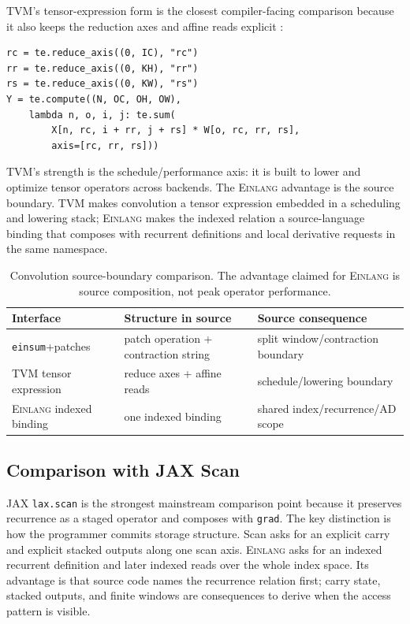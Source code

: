\documentclass[sigplan,screen,nonacm]{acmart}
\newcommand{\einlang}{\textsc{Einlang}}
\begin{document}
TVM's tensor-expression form is the closest compiler-facing comparison because it also keeps the reduction axes and affine reads explicit \cite{tvm2018}:
\begin{lstlisting}[style=pythoncode]
rc = te.reduce_axis((0, IC), "rc")
rr = te.reduce_axis((0, KH), "rr")
rs = te.reduce_axis((0, KW), "rs")
Y = te.compute((N, OC, OH, OW),
    lambda n, o, i, j: te.sum(
        X[n, rc, i + rr, j + rs] * W[o, rc, rr, rs],
        axis=[rc, rr, rs]))
\end{lstlisting}
TVM's strength is the schedule/performance axis: it is built to lower and optimize tensor operators across backends. The \einlang{} advantage is the source boundary. TVM makes convolution a tensor expression embedded in a scheduling and lowering stack; \einlang{} makes the indexed relation a source-language binding that composes with recurrent definitions and local derivative requests in the same namespace.

\begin{table}[t]
\centering
\caption{Convolution source-boundary comparison. The advantage claimed for \einlang{} is source composition, not peak operator performance.}
\label{tab:conv-source-comparison}
\renewcommand{\arraystretch}{1.06}
\small
\setlength{\tabcolsep}{4pt}
\begin{tabular}{@{}lll@{}}
\toprule
Interface & Structure in source & Source consequence \\
\midrule
\texttt{einsum}+patches & patch operation + contraction string & split window/contraction boundary \\
TVM tensor expression & reduce axes + affine reads & schedule/lowering boundary \\
\einlang{} indexed binding & one indexed binding & shared index/recurrence/AD scope \\
\bottomrule
\end{tabular}
\end{table}

\subsection{Comparison with JAX Scan}

JAX \texttt{lax.scan} is the strongest mainstream comparison point because it preserves recurrence as a staged operator and composes with \texttt{grad}. The key distinction is how the programmer commits storage structure. Scan asks for an explicit carry and explicit stacked outputs along one scan axis. \einlang{} asks for an indexed recurrent definition and later indexed reads over the whole index space. Its advantage is that source code names the recurrence relation first; carry state, stacked outputs, and finite windows are consequences to derive when the access pattern is visible.
\end{document}
